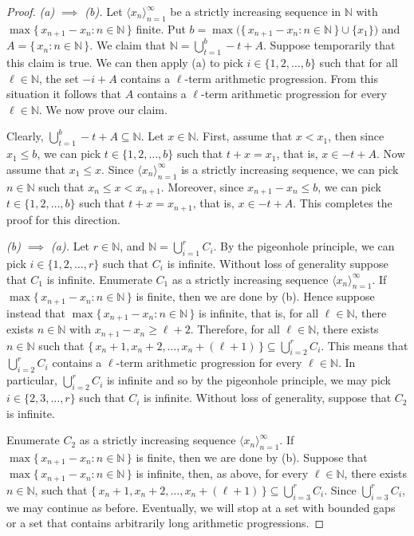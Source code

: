 \documentclass[12pt]{article}
\theoremstyle{plain}
\theoremstyle{definition}
\newcommand{\la}{\langle}
\newcommand{\ra}{\rangle}
\newcommand{\bbN}{\mathbb{N}}
\begin{document}
\begin{proof}
  \textsl{(a) $\implies$ (b).}
  Let $\la x_n \ra_{n=1}^\infty$ be a strictly increasing sequence in
  $\bbN$ with $\max\{\, x_{n+1} - x_n : n \in \bbN \,\}$ finite. 
  Put $b =\max\bigl(\{\, x_{n+1} - x_n : n \in \bbN \,\} \cup
  \{x_1\}\bigr)$ and $A = \{\, x_n : n \in \bbN \,\}$. 
  We claim that $\bbN = \bigcup_{t=1}^b -t+A$. 
  Suppose temporarily that this claim is true.
  We can then apply (a) to pick $i \in \{1, 2, \ldots, b\}$ such that
  for all $\ell \in \bbN$, the set $-i + A$ contains a
  \mbox{$\ell$-term} arithmetic progression. 
  From this situation it follows that $A$ contains a
  \mbox{$\ell$-term} arithmetic progression for every $\ell \in
  \bbN$. 
  We now prove our claim.
  
  Clearly, $\bigcup_{t=1}^b -t+A \subseteq \bbN$.
  Let $x \in \bbN$.
  First, assume that $x < x_1$, then since $x_1 \le b$, we can pick $t
  \in \{1, 2, \ldots, b\}$ such that $t + x = x_1$, that is, $x \in
  -t+A$.
  Now assume that $x_1 \le x$.
  Since $\la x_n \ra_{n=1}^\infty$ is a strictly increasing sequence,
  we can pick $n \in \bbN$ such that $x_n \le x < x_{n+1}$.
  Moreover, since $x_{n+1} - x_n \le b$, we can pick $t \in \{1, 2,
  \ldots, b\}$ such that $t + x = x_{n+1}$, that is, $x \in -t + A$.
  This completes the proof for this direction. 

  \textsl{(b) $\implies$ (a).}
  Let $r \in \bbN$, and $\bbN = \bigcup_{i=1}^r C_i$. 
  By the pigeonhole principle, we can pick $i \in \{1, 2, \ldots, r\}$
  such that $C_i$ is infinite.
  Without loss of generality suppose that $C_1$ is infinite. 
  Enumerate $C_1$ as a strictly increasing sequence $\la x_n
  \ra_{n=1}^\infty$.
  If $\max\{\, x_{n+1} - x_n : n \in \bbN \,\}$ is finite, then we are
  done by (b). 
  Hence suppose instead that $\max\{\, x_{n+1} - x_n : n \in \bbN
  \,\}$ is infinite, that is, for all $\ell \in \bbN$, there exists $n
  \in \bbN$ with $x_{n+1} - x_n \ge \ell + 2$. 
  Therefore, for all $\ell \in \bbN$, there exists $n \in \bbN$ such
  that $\{\, x_n + 1, x_n + 2, \ldots, x_n + (\ell + 1) \,\} \subseteq
  \bigcup_{i=2}^r C_i$. 
  This means that $\bigcup_{i=2}^r C_i$ contains a \mbox{$\ell$-term}
  arithmetic progression for every $\ell \in \bbN$.
  In particular, $\bigcup_{i=2}^r C_i$ is infinite and so by the
  pigeonhole principle, we may pick $i \in \{2, 3, \ldots, r\}$ such
  that $C_i$ is infinite.
  Without loss of generality, suppose that $C_2$ is infinite.

  Enumerate $C_2$ as a strictly increasing sequence $\la x_n
  \ra_{n=1}^\infty$.
  If $\max\{\, x_{n+1} - x_n : n \in \bbN \,\}$ is finite, then we are
  done by (b).
  Suppose that $\max\{\, x_{n+1} - x_n : n \in \bbN \,\}$ is infinite,
  then, as above, for every $\ell \in \bbN$, there exists $n \in
  \bbN$, such that $\{\, x_n +1, x_n + 2, \ldots, x_n + (\ell +1) \,\}
  \subseteq \bigcup_{i=3}^r C_i$. 
  Since $\bigcup_{i=3}^r C_i$, we may continue as before.
  Eventually, we will stop at a set with bounded gaps or a set that
  contains arbitrarily long arithmetic progressions.%
\end{proof}
\end{document}
